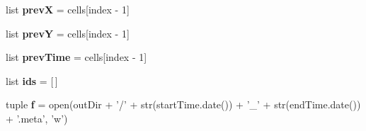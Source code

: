\begin{DoxyCompactItemize}
\item 
\hypertarget{namespacebest__track_a012575921a072dfdc8fd539700998e3d}{list {\bfseries prev\-X} = cells\mbox{[}index -\/ 1\mbox{]}}\label{namespacebest__track_a012575921a072dfdc8fd539700998e3d}

\item 
\hypertarget{namespacebest__track_a905d23f37d8a8521a62331cc53b610b8}{list {\bfseries prev\-Y} = cells\mbox{[}index -\/ 1\mbox{]}}\label{namespacebest__track_a905d23f37d8a8521a62331cc53b610b8}

\item 
\hypertarget{namespacebest__track_a8f0cb815d1465ac3bf910753e05c8d5a}{list {\bfseries prev\-Time} = cells\mbox{[}index -\/ 1\mbox{]}}\label{namespacebest__track_a8f0cb815d1465ac3bf910753e05c8d5a}

\item 
\hypertarget{namespacebest__track_a9b31a53d04c5401bb47a1f27a4357e55}{list {\bfseries ids} = \mbox{[}$\,$\mbox{]}}\label{namespacebest__track_a9b31a53d04c5401bb47a1f27a4357e55}

\item 
\hypertarget{namespacebest__track_a416c0a25339cc0f15fd8eaf13d1375fd}{tuple {\bfseries f} = open(out\-Dir + '/' + str(start\-Time.\-date()) + '\-\_\-' + str(end\-Time.\-date()) + '.meta', 'w')}\label{namespacebest__track_a416c0a25339cc0f15fd8eaf13d1375fd}

\end{DoxyCompactItemize}
